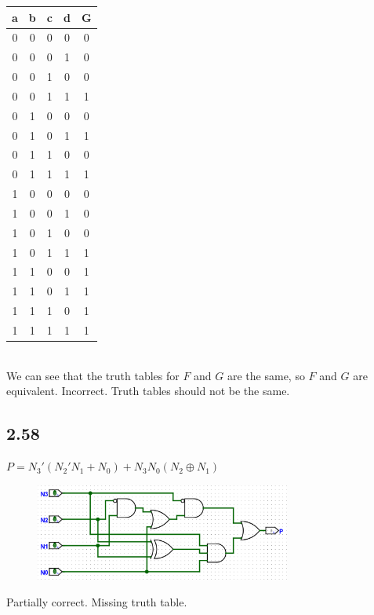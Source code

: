 \documentclass{article}
\begin{document}
\begin{minipage}{.4\textwidth}
\centering
\begin{tabular}{c c c c|c}
    a & b & c & d & G \\
    \hline
    0 & 0 & 0 & 0 & 0 \\
    0 & 0 & 0 & 1 & 0 \\
    0 & 0 & 1 & 0 & 0 \\
    0 & 0 & 1 & 1 & 1 \\
    0 & 1 & 0 & 0 & 0 \\
    0 & 1 & 0 & 1 & 1 \\
    0 & 1 & 1 & 0 & 0 \\
    0 & 1 & 1 & 1 & 1 \\
    1 & 0 & 0 & 0 & 0 \\
    1 & 0 & 0 & 1 & 0 \\
    1 & 0 & 1 & 0 & 0 \\
    1 & 0 & 1 & 1 & 1 \\
    1 & 1 & 0 & 0 & 1 \\
    1 & 1 & 0 & 1 & 1 \\
    1 & 1 & 1 & 0 & 1 \\
    1 & 1 & 1 & 1 & 1 \\
\end{tabular}
\end{minipage} \\
\noindent We can see that the truth tables for $F$ and $G$ are the same, so $F$ and $G$ are equivalent.
\textcolor{myred}{Incorrect. Truth tables should not be the same.}

\newpage
\subsection*{2.58}
$P = N_3'(N_2' N_1 + N_0) + N_3 N_0 (N_2 \oplus N_1)$
\begin{figure}[H]
    \centering
    \includegraphics[width=0.75\textwidth]{./images/2_58.png}
\end{figure}
\textcolor{myorange}{Partially correct. Missing truth table.}
\end{document}
